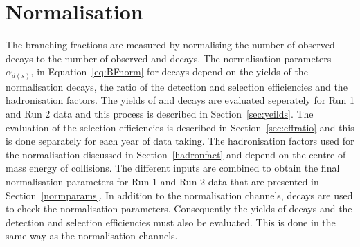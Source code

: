 {{%
\section{Normalisation}
\label{sec:Normalisation}

The \bmumu branching fractions are measured by normalising the number of observed \bmumu decays to the number of observed \bujpsik and \bdkpi decays. 
The normalisation parameters $\alpha_{d(s)}$, in Equation~\ref{eq:BFnorm} for \bmumu decays depend on the yields of the normalisation decays, the ratio of the detection and selection efficiencies and the hadronisation factors. 
The yields of \bujpsik and \bdkpi decays are evaluated seperately for Run 1 and Run 2 data and this process is described in Section~\ref{sec:yeilds}. 
The evaluation of the selection efficiencies is described in Section~\ref{sec:effratio} and this is done separately for each year of data taking.
The hadronisation factors used for the normalisation discussed in Section~\ref{hadronfact} and depend on the centre-of-mass energy of collisions.
The different inputs are combined to obtain the final normalisation parameters for Run 1 and Run 2 data that are presented in Section~\ref{normparams}.
In addition to the normalisation channels, \bsjpsiphi decays are used to check the normalisation parameters. Consequently the yields of \bsjpisphi decays and the detection and selection efficiencies must also be evaluated. This is done in the same way as the normalisation channels.



}}
